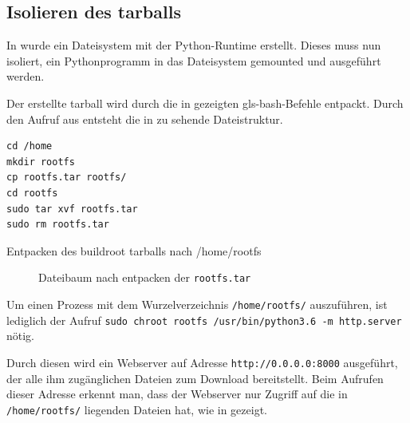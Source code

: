 \subsection{Isolieren des tarballs}
\label{sec:isolieren}
In  wurde ein Dateisystem mit der Python-Runtime erstellt. Dieses muss nun isoliert, ein Pythonprogramm in das Dateisystem gemounted und ausgeführt werden.

Der erstellte tarball wird durch die in  gezeigten \gls{gls-bash}-Befehle entpackt. Durch den Aufruf aus  entsteht die in  zu sehende Dateistruktur.

\begin{listing}[h]
	\begin{verbatim}
cd /home
mkdir rootfs
cp rootfs.tar rootfs/
cd rootfs
sudo tar xvf rootfs.tar
sudo rm rootfs.tar
	\end{verbatim}
	\caption{Entpacken des buildroot tarballs nach /home/rootfs}
	\label{lst:untarRootfs}
\end{listing}


\begin{figure}[h]
	\centering
	\begin{minipage}{0.9\textwidth}
	\end{minipage}
	\caption{Dateibaum nach entpacken der \texttt{rootfs.tar}}
	\label{fig:baumNachUntar}
\end{figure}

Um einen Prozess mit dem Wurzelverzeichnis \texttt{/home/rootfs/} auszuführen, ist lediglich der Aufruf \texttt{sudo chroot rootfs /usr/bin/python3.6 -m http.server} nötig.

Durch diesen wird ein Webserver auf Adresse \texttt{http://0.0.0.0:8000} ausgeführt, der alle ihm zugänglichen Dateien zum Download bereitstellt. Beim Aufrufen dieser Adresse erkennt man, dass der Webserver nur Zugriff auf die in \texttt{/home/rootfs/} liegenden Dateien hat, wie in  gezeigt.

